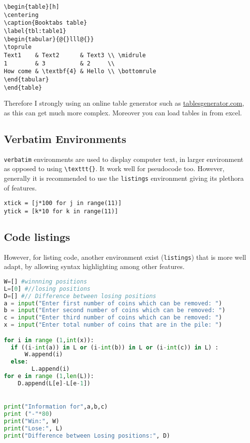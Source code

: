 \documentclass[11pt,a4paper,titlepage]{article}
\begin{document}
\begin{verbatim}
\begin{table}[h]
\centering
\caption{Booktabs table}
\label{tbl:table1}
\begin{tabular}{@{}lll@{}}
\toprule
Text1    & Text2      & Text3 \\ \midrule
1        & 3          & 2     \\
How come & \textbf{4} & Hello \\ \bottomrule
\end{tabular}
\end{table}
\end{verbatim}

Therefore I strongly using an online table generator such as \href{https://www.tablesgenerator.com/latex_tables}{tablesgenerator.com}, as this can get much more complex. Moreover you can load tables in from excel.

\medskip

\subsection{Verbatim Environments}

\texttt{verbatim} environments are used to display computer text, in larger environment as opposed to using \texttt{\textbackslash texttt\{\}}. It work well for pseudocode too. However, generally it is recommended to use the \texttt{listings} environment giving its plethora of features. 

\begin{verbatim}
xtick = [j*100 for j in range(11)]
ytick = [k*10 for k in range(11)]
\end{verbatim}

\subsection{Code listings}

However, for listing code, another environment exist (\texttt{listings}) that is more well adapt, by allowing syntax highlighting among other features.

\begin{lstlisting}[language=Python]
W=[] #winnning positions
L=[0] #//losing positions
D=[] #// Difference between losing positions
a = input("Enter first number of coins which can be removed: ")
b = input("Enter second number of coins which can be removed: ")
c = input("Enter third number of coins which can be removed: ")
x = input("Enter total number of coins that are in the pile: ")

for i in range (1,int(x)):
  if ((i-int(a)) in L or (i-int(b)) in L or (i-int(c)) in L) :
      W.append(i)
  else:
        L.append(i)
for e in range (1,len(L)):
    D.append(L[e]-L[e-1])


print("Information for",a,b,c)
print ("-"*80)
print("Win:", W)
print("Lose:", L)
print("Difference between Losing positions:", D)
\end{lstlisting}
\end{document}
